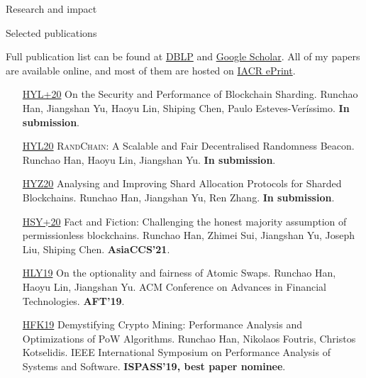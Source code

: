 \documentclass{resume} %
\begin{document}
\begin{rSection}{Research and impact}
\end{rSection}



\begin{rSection}{Selected publications}

    Full publication list can be found at \href{https://dblp.org/pers/hd/h/Han:Runchao}{DBLP} and \href{http://scholar.google.com/citations?user=xbpDocQAAAAJ&hl=en}{Google Scholar}.
    All of my papers are available online, and most of them are hosted on \href{https://eprint.iacr.org/}{IACR ePrint}.

    \begin{itemize}
        \item[\href{https://eprint.iacr.org/2020/1033}{HYL+20}] On the Security and Performance of Blockchain Sharding. Runchao Han, Jiangshan Yu, Haoyu Lin, Shiping Chen, Paulo Esteves-Veríssimo. \textbf{In submission}.
        \item[\href{https://eprint.iacr.org/2020/1033}{HYL20}] \textsc{RandChain}: A Scalable and Fair Decentralised Randomness Beacon. Runchao Han, Haoyu Lin, Jiangshan Yu. \textbf{In submission}.
        \item[\href{https://eprint.iacr.org/2020/943}{HYZ20}] Analysing and Improving Shard Allocation Protocols for Sharded Blockchains. Runchao Han, Jiangshan Yu, Ren Zhang. \textbf{In submission}.
        \item[\href{https://eprint.iacr.org/2019/752}{HSY+20}] Fact and Fiction: Challenging the honest majority assumption of permissionless blockchains. Runchao Han, Zhimei Sui, Jiangshan Yu, Joseph Liu, Shiping Chen.  \textbf{AsiaCCS'21}.
        \item[\href{https://eprint.iacr.org/2019/896}{HLY19}] On the optionality and fairness of Atomic Swaps. Runchao Han, Haoyu Lin, Jiangshan Yu.  ACM Conference on Advances in Financial Technologies. \textbf{AFT'19}.
        \item[\href{https://www.research.manchester.ac.uk/portal/files/85753741/paper.pdf}{HFK19}] Demystifying Crypto Mining: Performance Analysis and Optimizations of PoW Algorithms. Runchao Han, Nikolaos Foutris, Christos Kotselidis. IEEE International Symposium on Performance Analysis of Systems and Software. \textbf{ISPASS'19, best paper nominee}.
    \end{itemize}

\end{rSection}
\end{document}
